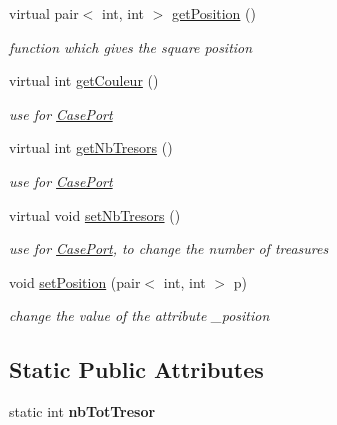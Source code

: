 \begin{DoxyCompactItemize}
\item 
virtual pair$<$ int, int $>$ \hyperlink{class_case_ae952f972865e7aeda610791973138d16}{getPosition} ()
\begin{DoxyCompactList}\small\item\em function which gives the square position \item\end{DoxyCompactList}\item 
virtual int \hyperlink{class_case_ab0a449f4f324734c8ad3f149c8dd50a6}{getCouleur} ()
\begin{DoxyCompactList}\small\item\em use for \hyperlink{class_case_port}{CasePort} \item\end{DoxyCompactList}\item 
virtual int \hyperlink{class_case_a47a04f64f3a0e3c5e8588075eec0dc55}{getNbTresors} ()
\begin{DoxyCompactList}\small\item\em use for \hyperlink{class_case_port}{CasePort} \item\end{DoxyCompactList}\item 
\hypertarget{class_case_a43d61d4920ec11155106ca9cf3bedaad}{
virtual void \hyperlink{class_case_a43d61d4920ec11155106ca9cf3bedaad}{setNbTresors} ()}
\label{class_case_a43d61d4920ec11155106ca9cf3bedaad}

\begin{DoxyCompactList}\small\item\em use for \hyperlink{class_case_port}{CasePort}, to change the number of treasures \item\end{DoxyCompactList}\item 
\hypertarget{class_case_a3a28b6465f9817cf07074b72ea4f07e3}{
void \hyperlink{class_case_a3a28b6465f9817cf07074b72ea4f07e3}{setPosition} (pair$<$ int, int $>$ p)}
\label{class_case_a3a28b6465f9817cf07074b72ea4f07e3}

\begin{DoxyCompactList}\small\item\em change the value of the attribute \_\-position \item\end{DoxyCompactList}\end{DoxyCompactItemize}
\subsection*{Static Public Attributes}
\begin{DoxyCompactItemize}
\item 
\hypertarget{class_case_a1105ac829dadb10c7528872342c34a9e}{
static int {\bfseries nbTotTresor}}
\label{class_case_a1105ac829dadb10c7528872342c34a9e}

\end{DoxyCompactItemize}
